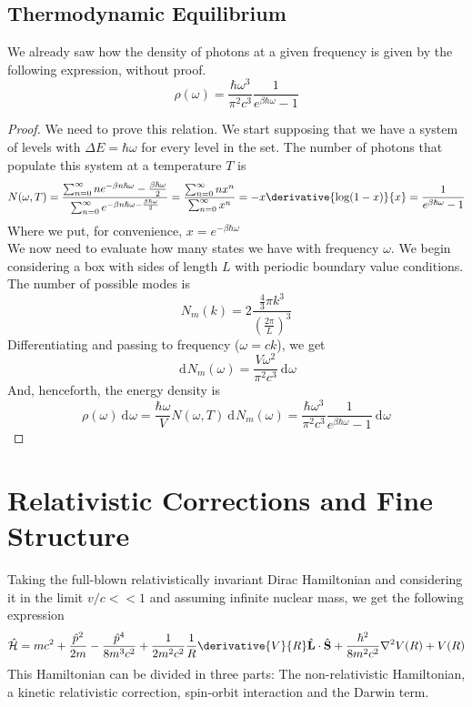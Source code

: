 \documentclass[a4paper, 11pt]{book}
\renewcommand{\vec}[1]{\mathbf{#1}}
\newcommand{\1}{\opr{\mathds{1}}}
\newcommand{\diff}[2][]{\ \mathrm{d}^{#1}#2}
\newcommand{\ham}{\mathcal{H}}
\newcommand{\opr}[1]{\hat{#1}}
\newcommand{\vecopr}[1]{\opr{\vec{#1}}}
\theoremstyle{plain}
\begin{document}
	\subsection{Thermodynamic Equilibrium}
	We already saw how the density of photons at a given frequency is given by the following expression, without proof.
	\begin{equation*}
		\rho(\omega)=\frac{\hbar\omega^3}{\pi^2c^3}\frac{1}{e^{\beta\hbar\omega}-1}
	\end{equation*}
	\begin{proof}
		We need to prove this relation. We start supposing that we have a system of levels with $\Delta E=\hbar\omega$ for every level in the set. The number of photons that populate this system at a temperature $T$ is
		\begin{equation}
			N(\omega,T)=\frac{\sum_{n=0}^{\infty}ne^{-\beta n\hbar\omega}-\frac{\beta\hbar\omega}{2}}{\sum_{n=0}^{\infty}e^{-\beta n\hbar\omega-\frac{\beta\hbar\omega}{2}}}=\frac{\sum_{n=0}^{\infty}nx^n}{\sum_{n=0}^{\infty}x^n}=-x\derivative{\log(1-x)}{x}=\frac{1}{e^{\beta\hbar\omega}-1}
			\label{eq:numberofphotonsaeq}
		\end{equation}
		Where we put, for convenience, $x=e^{-\beta\hbar\omega}$\\
		We now need to evaluate how many states we have with frequency $\omega$. We begin considering a box with sides of length $L$ with periodic boundary value conditions. The number of possible modes is
		\begin{equation*}
			N_m(k)=2\frac{\frac{4}{3}\pi k^3}{\left( \frac{2\pi}{L} \right)^3}
		\end{equation*}
		Differentiating and passing to frequency ($\omega=ck$), we get
		\begin{equation}
			\diff{N_m}(\omega)=\frac{V\omega^2}{\pi^2c^3}\diff{\omega}
			\label{eq:frequencymodes}
		\end{equation}
		And, henceforth, the energy density is
		\begin{equation}
			\rho(\omega)\diff{\omega}=\frac{\hbar\omega}{V}N(\omega,T)\diff{N_m}(\omega)=\frac{\hbar\omega^3}{\pi^2c^3}\frac{1}{e^{\beta\hbar\omega}-1}\diff{\omega}
			\label{eq:rhoomegamodesproof}
		\end{equation}
	\end{proof}
	\section{Relativistic Corrections and Fine Structure}
	Taking the full-blown relativistically invariant Dirac Hamiltonian and considering it in the limit $v/c<<1$ and assuming infinite nuclear mass, we get the following expression
	\begin{equation}
		\opr{\ham}=mc^2+\frac{\opr{p}^2}{2m}-\frac{\opr{p}^4}{8m^3c^2}+\frac{1}{2m^2c^2}\frac{1}{R}\derivative{V}{R}\vecopr{L}\cdot\vecopr{S}+\frac{\hbar^2}{8m^2c^2}\nabla^2V(R)+V(R)
		\label{eq:dirachamiltonianslowspeed}
	\end{equation}
	This Hamiltonian can be divided in three parts: The non-relativistic Hamiltonian, a kinetic relativistic correction, spin-orbit interaction and the Darwin term.\\
\end{document}
